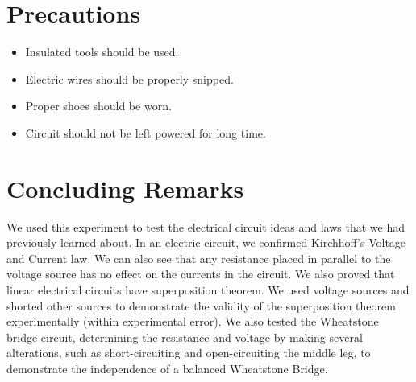 \documentclass{article}
\begin{document}
\vspace{15px}

\section{Precautions}

\begin{itemize}
    \item Insulated tools should be used.
    \item Electric wires should be properly snipped.
    \item Proper shoes should be worn.
    \item Circuit should not be left powered for long time.

\end{itemize}

\vspace{15px}

\section{Concluding Remarks}
We used this experiment to test the electrical circuit ideas and laws that we had previously learned about. In an electric circuit, we confirmed Kirchhoff's Voltage and Current law. We can also see that any resistance placed in parallel to the voltage source has no effect on the currents in the circuit. We also proved that linear electrical circuits have superposition theorem. We used voltage sources and shorted other sources to demonstrate the validity of the superposition theorem experimentally (within experimental error). We also tested the Wheatstone bridge circuit, determining the resistance and voltage by making several alterations, such as short-circuiting and open-circuiting the middle leg, to demonstrate the independence of a balanced Wheatstone Bridge.
\end{document}
